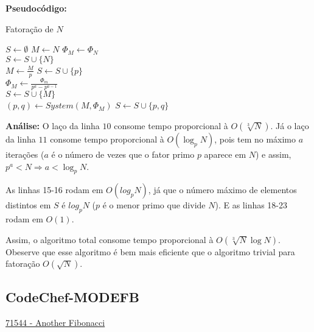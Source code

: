 \textbf{Pseudocódigo:}
\begin{algorithm}
\caption{Fatoração de $N$}
\begin{algorithmic}[1]
\State $S \gets \emptyset$ 
\State $M \gets N$
\State $\Phi_M \gets \Phi_N$
\\
 
\State $S \gets S \cup \{N\}$
\State {}
\EndIf
\\
\State $M \gets \frac{M}{p}$
\State $S \gets S \cup \{p\}$
\EndWhile
\EndFor
\\
\State $\Phi_M \gets \frac{\Phi_m}{p^a - p^{a-1}}$ 
\EndFor
\\
 
\State $S \gets S \cup \{M\}$
\State {}
\EndIf
\\
\State $(p, q) \gets System(M, \Phi_M)$ 
\State $S \gets S \cup \{p, q\}$
\State {}

\EndProcedure
\end{algorithmic}
\end{algorithm}


\textbf{Análise:}
O laço da linha $10$ consome tempo proporcional à $O(\sqrt[3]N)$. Já o laço da linha $11$ consome tempo proporcional à $O(\log_pN)$, pois tem no máximo $a$ iterações ($a$ é o número de vezes que o fator primo $p$ aparece em $N$) e assim, $p^a < N \Rightarrow a < \log_p{N}$. 

As linhas 15-16 rodam em $O(log_pN)$, já que o número máximo de elementos distintos em $S$ é $log_pN$ ($p$ é o menor primo que divide $N$).
E as linhas 18-23 rodam em $O(1)$.

Assim, o algoritmo total consome tempo proporcional à $O(\sqrt[3]N \log N)$. 
Obeserve que esse algoritmo é bem mais eficiente que o algoritmo trivial para fatoração $O(\sqrt N)$.



\subsection{CodeChef-MODEFB}
\href{https://www.codechef.com/problems/MOREFB}{71544 - Another Fibonacci}\\

